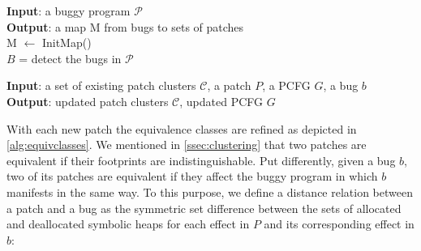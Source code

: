  
\begin{algorithm}[t]
	\caption{}
	\label{alg:main}
	\textbf{Input}:  a buggy program $\mathcal{P}$\\
	\textbf{Output}: a map M from bugs to sets of patches \\
	M $\leftarrow$ InitMap()\\
   $B$ = detect the bugs in $\mathcal{P}$   \\
\end{algorithm}   

\begin{algorithm}[t]
	\caption{}
	\label{alg:equivclasses}
	\textbf{Input}:  a set of existing patch clusters $\mathcal{C}$, a patch $P$, a PCFG $G$, a bug $b$\\
	\textbf{Output}: updated patch clusters $\mathcal{C}$, updated PCFG $G$ \\
\end{algorithm}

With each new patch 
the equivalence classes are refined as depicted 
in \autoref{alg:equivclasses}. We mentioned in \autoref{ssec:clustering} that two patches are equivalent if their footprints are indistinguishable. Put differently, given a bug $b$, two of its patches are equivalent 
if they affect the buggy program in which $b$ manifests in the same way. To this purpose, we define a distance relation between a patch and a bug as the symmetric set difference between the sets of allocated and deallocated symbolic heaps for each effect in $P$ and its corresponding effect in $b$:

